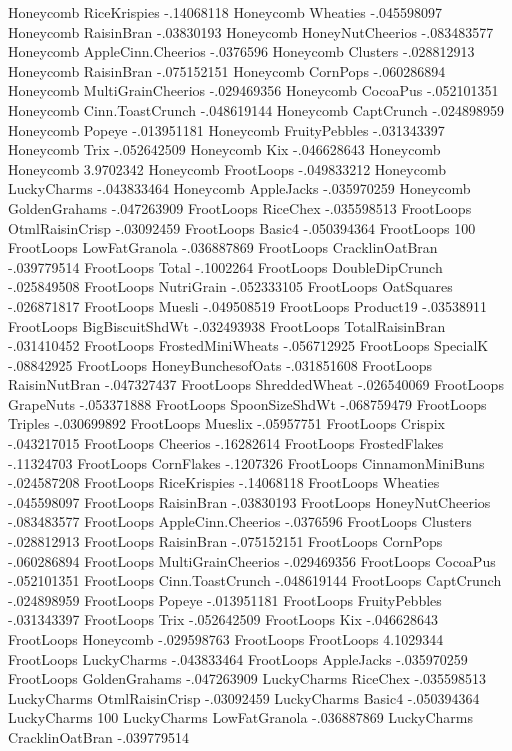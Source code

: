 Honeycomb	RiceKrispies	-.14068118
Honeycomb	Wheaties	-.045598097
Honeycomb	RaisinBran	-.03830193
Honeycomb	HoneyNutCheerios	-.083483577
Honeycomb	AppleCinn.Cheerios	-.0376596
Honeycomb	Clusters	-.028812913
Honeycomb	RaisinBran	-.075152151
Honeycomb	CornPops	-.060286894
Honeycomb	MultiGrainCheerios	-.029469356
Honeycomb	CocoaPus	-.052101351
Honeycomb	Cinn.ToastCrunch	-.048619144
Honeycomb	CaptCrunch	-.024898959
Honeycomb	Popeye	-.013951181
Honeycomb	FruityPebbles	-.031343397
Honeycomb	Trix	-.052642509
Honeycomb	Kix	-.046628643
Honeycomb	Honeycomb	3.9702342
Honeycomb	FrootLoops	-.049833212
Honeycomb	LuckyCharms	-.043833464
Honeycomb	AppleJacks	-.035970259
Honeycomb	GoldenGrahams	-.047263909
FrootLoops	RiceChex	-.035598513
FrootLoops	OtmlRaisinCrisp	-.03092459
FrootLoops	Basic4	-.050394364
FrootLoops	100%
FrootLoops	LowFatGranola	-.036887869
FrootLoops	CracklinOatBran	-.039779514
FrootLoops	Total	-.1002264
FrootLoops	DoubleDipCrunch	-.025849508
FrootLoops	NutriGrain	-.052333105
FrootLoops	OatSquares	-.026871817
FrootLoops	Muesli	-.049508519
FrootLoops	Product19	-.03538911
FrootLoops	BigBiscuitShdWt	-.032493938
FrootLoops	TotalRaisinBran	-.031410452
FrootLoops	FrostedMiniWheats	-.056712925
FrootLoops	SpecialK	-.08842925
FrootLoops	HoneyBunchesofOats	-.031851608
FrootLoops	RaisinNutBran	-.047327437
FrootLoops	ShreddedWheat	-.026540069
FrootLoops	GrapeNuts	-.053371888
FrootLoops	SpoonSizeShdWt	-.068759479
FrootLoops	Triples	-.030699892
FrootLoops	Mueslix	-.05957751
FrootLoops	Crispix	-.043217015
FrootLoops	Cheerios	-.16282614
FrootLoops	FrostedFlakes	-.11324703
FrootLoops	CornFlakes	-.1207326
FrootLoops	CinnamonMiniBuns	-.024587208
FrootLoops	RiceKrispies	-.14068118
FrootLoops	Wheaties	-.045598097
FrootLoops	RaisinBran	-.03830193
FrootLoops	HoneyNutCheerios	-.083483577
FrootLoops	AppleCinn.Cheerios	-.0376596
FrootLoops	Clusters	-.028812913
FrootLoops	RaisinBran	-.075152151
FrootLoops	CornPops	-.060286894
FrootLoops	MultiGrainCheerios	-.029469356
FrootLoops	CocoaPus	-.052101351
FrootLoops	Cinn.ToastCrunch	-.048619144
FrootLoops	CaptCrunch	-.024898959
FrootLoops	Popeye	-.013951181
FrootLoops	FruityPebbles	-.031343397
FrootLoops	Trix	-.052642509
FrootLoops	Kix	-.046628643
FrootLoops	Honeycomb	-.029598763
FrootLoops	FrootLoops	4.1029344
FrootLoops	LuckyCharms	-.043833464
FrootLoops	AppleJacks	-.035970259
FrootLoops	GoldenGrahams	-.047263909
LuckyCharms	RiceChex	-.035598513
LuckyCharms	OtmlRaisinCrisp	-.03092459
LuckyCharms	Basic4	-.050394364
LuckyCharms	100%
LuckyCharms	LowFatGranola	-.036887869
LuckyCharms	CracklinOatBran	-.039779514
